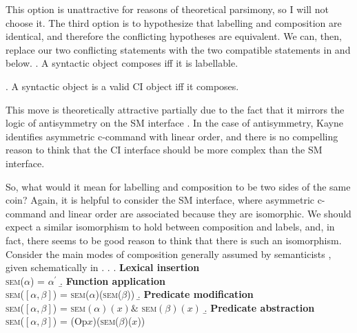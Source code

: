 \documentclass[MilwayThesis]{subfiles}
\begin{document}
This option is unattractive for reasons of theoretical parsimony, so I will not choose it.
The third option is to hypothesize that labelling and composition are identical, and therefore the conflicting hypotheses are equivalent.
We can, then, replace our two conflicting statements with the two compatible statements in \Next and \NNext below.
\ex. A syntactic object composes iff it is labellable.

\ex. A syntactic object is a valid CI object iff it composes.

This move is theoretically attractive partially due to the fact that it mirrors the logic of antisymmetry on the SM interface \parencite{kayne1994antisymmetry}.
In the case of antisymmetry, Kayne identifies asymmetric c-command with linear order, and there is no compelling reason to think that the CI interface should be more complex than the SM interface.

So, what would it mean for labelling and composition to be two sides of the same coin?
Again, it is helpful to consider the SM interface, where asymmetric c-command and linear order are associated because they are isomorphic.
We should expect a similar isomorphism to hold between composition and labels, and, in fact, there seems to be good reason to think that there is such an isomorphism.
Consider the main modes of composition generally assumed by semanticists \parencite[\textit{e.g.}, by][]{heimkratzer1998semantics}, given schematically in \Next.
\ex. 
\a. \textbf{Lexical insertion}\\
\textsc{sem}($\alpha$) = $\alpha^\prime$
\b. \textbf{Function application}\\
\textsc{sem}($\left[ \alpha, \beta \right]$) = \textsc{sem}($\alpha$)(\textsc{sem}($\beta$))
\b. \textbf{Predicate modification}\\
\textsc{sem}($\left[ \alpha, \beta \right]$) = \textsc{sem}$(\alpha)(x) \&$ \textsc{sem}$(\beta)(x)$
\b. \textbf{Predicate abstraction}\\
\textsc{sem}($\left[ \alpha, \beta \right]$) = (Op$x$)(\textsc{sem}($\beta$)($x$))
\end{document}
